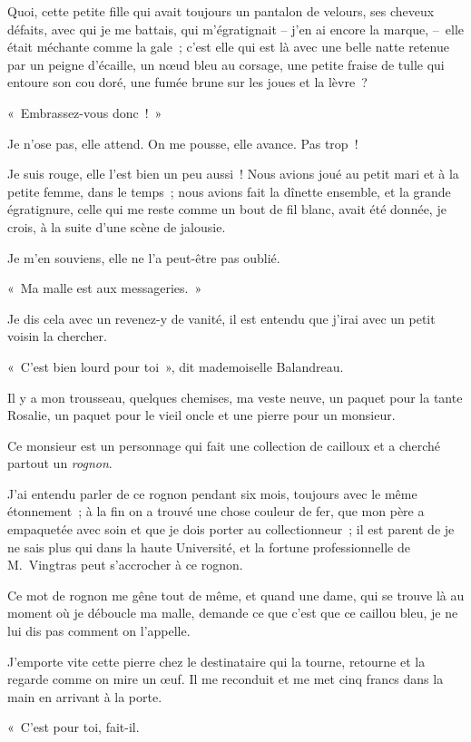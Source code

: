 \documentclass[french,twoside]{book} %
\begin{document}
Quoi, cette petite fille qui avait toujours un pantalon de velours, ses cheveux défaits, avec qui je me battais, qui m’égratignait – j’en ai encore la marque, – elle était méchante comme la gale ; c’est elle qui est là avec une belle natte retenue par un peigne d’écaille, un nœud bleu au corsage, une petite fraise de tulle qui entoure son cou doré, une fumée brune sur les joues et la lèvre ?\par
« Embrassez-vous donc ! »\par
Je n’ose pas, elle attend. On me pousse, elle avance. Pas trop !\par
Je suis rouge, elle l’est bien un peu aussi ! Nous avions joué au petit mari et à la petite femme, dans le temps ; nous avions fait la dînette ensemble, et la grande égratignure, celle qui me reste comme un bout de fil blanc, avait été donnée, je crois, à la suite d’une scène de jalousie.\par
Je m’en souviens, elle ne l’a peut-être pas oublié.\par
« Ma malle est aux messageries. »\par
Je dis cela avec un revenez-y de vanité, il est entendu que j’irai avec un petit voisin la chercher.\par
« C’est bien lourd pour toi », dit mademoiselle Balandreau.\par
Il y a mon trousseau, quelques chemises, ma veste neuve, un paquet pour la tante Rosalie, un paquet pour le vieil oncle et une pierre pour un monsieur.\par
Ce monsieur est un personnage qui fait une collection de cailloux et a cherché partout un \emph{rognon}.\par
J’ai entendu parler de ce rognon pendant six mois, toujours avec le même étonnement ; à la fin on a trouvé une chose couleur de fer, que mon père a empaquetée avec soin et que je dois porter au collectionneur ; il est parent de je ne sais plus qui dans la haute Université, et la fortune professionnelle de M. Vingtras peut s’accrocher à ce rognon.\par
Ce mot de rognon me gêne tout de même, et quand une dame, qui se trouve là au moment où je déboucle ma malle, demande ce que c’est que ce caillou bleu, je ne lui dis pas comment on l’appelle.\par
J’emporte vite cette pierre chez le destinataire qui la tourne, retourne et la regarde comme on mire un œuf. Il me reconduit et me met cinq francs dans la main en arrivant à la porte.\par
« C’est pour toi, fait-il.\par
\end{document}
